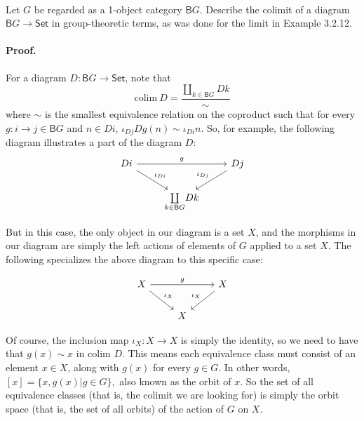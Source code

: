 \documentclass[main.tex]{subfiles}
\begin{document}
\paragraph{}
\begin{exercise}
	Let $ G $ be regarded as a 1-object category $ \mathsf{B}G $. Describe the
	colimit of a diagram $ \mathsf{B}G \to \mathsf{Set} $ in group-theoretic
	terms, as was done for the limit in Example 3.2.12.
\end{exercise}
\paragraph{Proof.}

For a diagram $ D: \mathsf{B}G \to \mathsf{Set} $, note that
\[\mathrm{colim}\ D = {\frac{ \underset{k \in \mathsf{B}G}{\coprod} Dk}{\sim}} \]
where $ \sim $ is the smallest equivalence relation on the coproduct such that
for every $ g: i \to j \in \mathsf{B}G $ and $ n \in Di $, $ \iota_{Dj} Dg(n)
\sim \iota_{Di} n $. So, for example, the following diagram illustrates a part
of the diagram $ D $:
\[\begin{tikzcd}
		Di \arrow[rr, "g"] \arrow[rd, "\iota_{Di}"] &  & Dj \arrow[ld, "\iota_{Dj}"'] \\ &
		\underset{k \in \mathsf{B}G}{\coprod} Dk &
\end{tikzcd}\]

But in this case, the only object in our diagram is a set $ X $, and the
morphisms in our diagram are simply the left actions of elements of $ G $
applied to a set $ X. $ The following specializes the above diagram to this
specific case:

\[\begin{tikzcd}
	X \arrow[rr, "g"] \arrow[rd, "\iota_{X}"] &  &
	X \arrow[ld, "\iota_{X}"'] \\ & X &
\end{tikzcd}\]

Of course, the inclusion map $ \iota_X: X \to X $ is simply the identity, so we
need to have that $ g(x) \sim x $ in colim $ D $. This means each equivalence
class must consist of an element $ x \in X $, along with $ g(x) $ for every $ g
\in G $. In other words, $ [x] = \{x, g(x) | g \in G\}, $ also known as the
orbit of $ x $. So the set of all equivalence classes (that is, the colimit we
are looking for) is simply the orbit space (that is, the set of all orbits) of
the action of $ G $ on $ X $.
\end{document}
